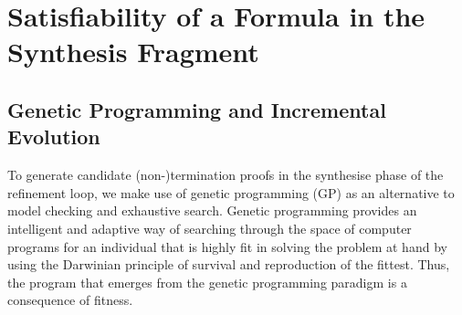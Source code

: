 \documentclass[preprint]{sigplanconf}
\newtheorem{conjecture}[theorem]{Conjecture}
\theoremstyle{definition}
\newtheorem{definition}[theorem]{Definition}
\begin{document}


\section{Satisfiability of a Formula in the Synthesis Fragment} \label{sec:synthesis}
%
\iffalse
\subsection{The Search Space and the Kolmogorov Complexity of a Ranking Function}
\begin{conjecture}
The lexicographic ordering does not influence the size of the search space. Thus, finding potentially lexicographic termination arguments is not more difficult than finding non-lexicographic ones.   
\end{conjecture}

As a consequence of the aforementioned conjecture, we do not need to commit to a specific form of the termination argument. While other approaches, e.g. \cite{DBLP:conf/tacas/LeikeH14}, 
conduct independent searches for each possible form of the ranking function with some of them futile whenever the assumed constrained ranking function does not exist, we have a single search that aims at finding the ranking function with the lowest Kolmogorov complexity. 
\fi
%
%


\subsection{Genetic Programming and Incremental Evolution} \label{sec:gp}
To generate candidate (non-)termination proofs in the synthesise phase of the refinement loop,
we make use of genetic programming (GP) \cite{langdon:fogp} as an alternative to model checking and exhaustive search.  
Genetic programming provides an intelligent and adaptive way of searching through the space of computer programs
for an individual that is highly fit in solving the problem at hand
by using the Darwinian principle of survival and reproduction of the fittest.
Thus, the program that emerges from the genetic programming paradigm is a consequence of fitness. 
\end{document}

